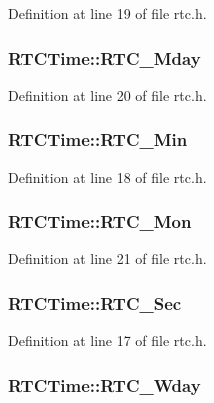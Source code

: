 Definition at line 19 of file rtc.h.

\hypertarget{structRTCTime_a5077e93b31e29a15d1f0d8191b9e9ea9}{
\subsubsection[{RTC\_\-Mday}]{ {\bf RTCTime::RTC\_\-Mday}}}
\label{structRTCTime_a5077e93b31e29a15d1f0d8191b9e9ea9}


Definition at line 20 of file rtc.h.

\hypertarget{structRTCTime_aa9c8cd2d54685a9c6aa7093d0e6cd1dd}{
\subsubsection[{RTC\_\-Min}]{ {\bf RTCTime::RTC\_\-Min}}}
\label{structRTCTime_aa9c8cd2d54685a9c6aa7093d0e6cd1dd}


Definition at line 18 of file rtc.h.

\hypertarget{structRTCTime_ac01f07a46c73b86011342b90b8c1100a}{
\subsubsection[{RTC\_\-Mon}]{ {\bf RTCTime::RTC\_\-Mon}}}
\label{structRTCTime_ac01f07a46c73b86011342b90b8c1100a}


Definition at line 21 of file rtc.h.

\hypertarget{structRTCTime_ab14ec114407f3361087624eea5d43c19}{
\subsubsection[{RTC\_\-Sec}]{ {\bf RTCTime::RTC\_\-Sec}}}
\label{structRTCTime_ab14ec114407f3361087624eea5d43c19}


Definition at line 17 of file rtc.h.

\hypertarget{structRTCTime_a4f063d5cc84028b06d4cdac73e0d74c9}{
\subsubsection[{RTC\_\-Wday}]{ {\bf RTCTime::RTC\_\-Wday}}}
\label{structRTCTime_a4f063d5cc84028b06d4cdac73e0d74c9}


